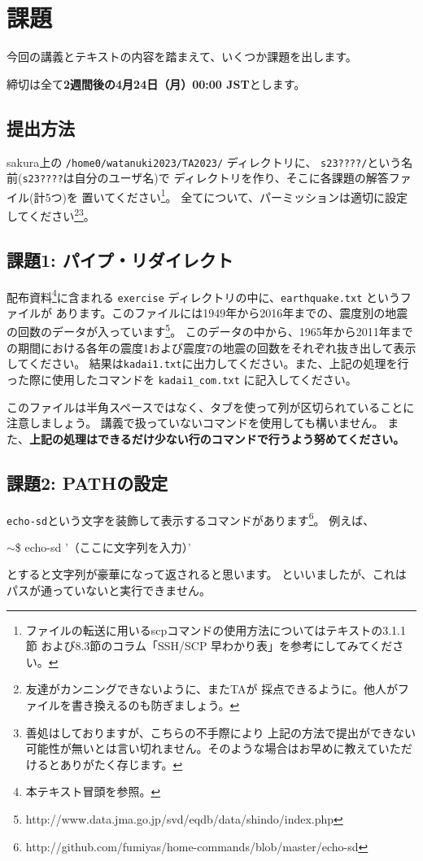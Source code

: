 \documentclass[a4j]{ltjreport}
\begin{document}
    \chapter{課題}
    今回の講義とテキストの内容を踏まえて、いくつか課題を出します。

    締切は全て\textbf{2週間後の4月24日（月）00:00 JST}とします。

    \section*{提出方法}
    sakura上の \verb+/home0/watanuki2023/TA2023/+ ディレクトリに、
    \verb+s23????/+という名前(\verb+s23????+は自分のユーザ名)で
    ディレクトリを作り、そこに各課題の解答ファイル(計5つ)を
    置いてください\footnote{ファイルの転送に用いるscpコマンドの使用方法についてはテキストの3.1.1節
    および8.3節のコラム「SSH/SCP 早わかり表」を参考にしてみてください。}。
    全てについて、パーミッションは適切に設定してください\footnote{友達がカンニングできないように、またTAが
    採点できるように。他人がファイルを書き換えるのも防ぎましょう。}\footnote{善処はしておりますが、こちらの不手際により
    上記の方法で提出ができない可能性が無いとは言い切れません。そのような場合はお早めに教えていただけるとありがたく存じます。}。

    \section*{課題1: パイプ・リダイレクト}
    配布資料\footnote{本テキスト冒頭を参照。}に含まれる \verb+exercise+ ディレクトリの中に、\verb+earthquake.txt+ というファイルが
    あります。このファイルには1949年から2016年までの、震度別の地震の回数のデータが入っています\footnote{http://www.data.jma.go.jp/svd/eqdb/data/shindo/index.php}。
    このデータの中から、1965年から2011年までの期間における各年の震度1および震度7の地震の回数をそれぞれ抜き出して表示してください。
    結果は\verb+kadai1.txt+に出力してください。また、上記の処理を行った際に使用したコマンドを \verb+kadai1_com.txt+ に記入してください。

    このファイルは半角スペースではなく、タブを使って列が区切られていることに
    注意しましょう。
    講義で扱っていないコマンドを使用しても構いません。
    また、\textbf{上記の処理はできるだけ少ない行のコマンドで行うよう努めてください。}

    \section*{課題2: PATHの設定}
    \verb+echo-sd+という文字を装飾して表示するコマンドがあります\footnote{http://github.com/fumiyas/home-commands/blob/master/echo-sd}。
    例えば、
    \begin{screen}
        $\sim$\$ echo-sd '（ここに文字列を入力）'
    \end{screen}
    とすると文字列が豪華になって返されると思います。
    といいましたが、これはパスが通っていないと実行できません。
    
\end{document}
